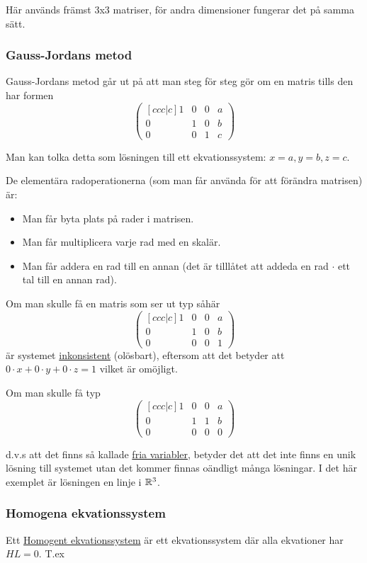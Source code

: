 \documentclass[../main.tex]{subfiles}
\begin{document}
Här används främst 3x3 matriser, för andra dimensioner fungerar det på samma sätt.

\subsubsection{Gauss-Jordans metod}
\label{gaussjordan}
Gauss-Jordans metod går ut på att man steg för steg gör om en matris tills den har formen
$$
\begin{pmatrix}[ccc|c]
  1 & 0 & 0 & a\\
  0 & 1 & 0 & b\\
  0 & 0 & 1 & c
\end{pmatrix} 
$$

Man kan tolka detta som lösningen till ett ekvationssystem: $x = a, y = b, z = c$.

De elementära radoperationerna (som man får använda för att förändra matrisen) är:
\begin{itemize}
    \item Man får byta plats på rader i matrisen.
    \item Man får multiplicera varje rad med en skalär.
    \item Man får addera en rad till en annan (det är tilllåtet att addeda en rad $\cdot$ ett tal till en annan rad).
\end{itemize}

Om man skulle få en matris som ser ut typ såhär
$$
\begin{pmatrix}[ccc|c]
  1 & 0 & 0 & a\\
  0 & 1 & 0 & b\\
  0 & 0 & 0 & 1
\end{pmatrix} 
$$
är systemet \underline{inkonsistent} (olösbart), eftersom att det betyder att $0\cdot x + 0\cdot y + 0\cdot z = 1$ vilket är omöjligt.

Om man skulle få typ
$$
\begin{pmatrix}[ccc|c]
  1 & 0 & 0 & a\\
  0 & 1 & 1 & b\\
  0 & 0 & 0 & 0
\end{pmatrix} 
$$

d.v.s att det finns så kallade \underline{fria variabler}, betyder det att det inte finns en unik lösning till systemet utan det kommer finnas oändligt många lösningar. I det här exemplet är lösningen en linje i $\mathbb{R}^{3}$.

\subsubsection{Homogena ekvationssystem}
Ett \underline{Homogent ekvationssystem} är ett ekvationssystem där alla ekvationer har $HL = 0$. T.ex
\end{document}
